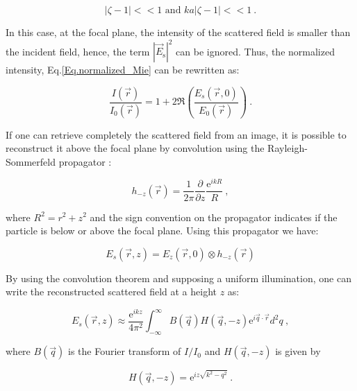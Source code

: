 \begin{equation}
	|\zeta - 1| << 1 \text{ and } ka|\zeta - 1| << 1 ~.
\end{equation}

In this case, at the focal plane, the intensity of the scattered field is smaller than the incident field, hence, the term $|\vec{E}_\mathrm{s}|^2$ can be ignored. Thus, the normalized intensity, Eq.\ref{Eq.normalized_Mie} can be rewritten as:

\begin{equation}
\frac{I(\vec{r})}{I_0(\vec{r})}= 1 + 2\Re \left( \frac{E_s(\vec{r},0)}{E_0(\vec{r})} \right) ~.
\end{equation}

If one can retrieve completely the scattered field from an image, it is possible to reconstruct it above the focal plane by convolution using the Rayleigh-Sommerfeld propagator \cite{goodman_introduction_2005}:

\begin{equation}
	h_{-z}(\vec{r}) = \frac{1}{2 \pi} \frac{\partial}{\partial z} \frac{\mathrm{e}^{ikR}}{R} ~,
	\label{Eq:propagator}
\end{equation}

where $ R^2 = r^2 + z^2 $ and the sign convention on the propagator indicates if the particle is below or above the focal plane. Using this propagator we have:

\begin{equation}
	E_s(\vec{r}, z) = E_z(\vec{r}, 0) \otimes h_{-z}(\vec{r})
\end{equation}

By using the convolution theorem \cite{cheong_strategies_2010, goodman_introduction_2005, sherman_application_1967,schnars_digital_1994} and supposing a uniform illumination, one can write the reconstructed scattered field at a height $z$ as:

\begin{equation}
	E_s(\vec{r}, z) \approx \frac{\mathrm{e}^{ikz}}{4\pi ^2}
	\int ^\infty _{- \infty}
	B(\vec{q}) H(\vec{q}, -z) \mathrm{e}^{i \vec{q} \cdot \vec{r}} d^2 q
	\label{Eq.RS} ~,
\end{equation}

where $B(\vec{q})$ is the Fourier transform of $I/I_0$ and $H(\vec{q}, -z)$ is given by

\begin{equation}
	H(\vec{q}, -z) = \mathrm{e}^{iz \sqrt{k^2 - q^2}} ~.
\end{equation}

